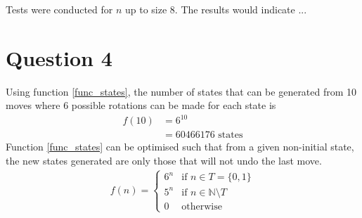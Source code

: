 \documentclass[]{article}
\begin{document}
Tests were conducted for \(n\) up to size 8. The results would indicate ...

\section*{Question 4}
Using function \ref{func_states}, the number of states that can be generated from 10 moves where 6 possible rotations can be made for each state is
\begin{equation*}
\begin{split}
  f(10) & = 6^{10} \\
		  & = 60466176\text{ states}
\end{split}
\end{equation*}								
Function \ref{func_states} can be optimised such that from a given non-initial state, the new states generated are only those that will not undo the last move.
\begin{equation}
\begin{split}
f(n) =
\begin{cases}
	6^{n} & \text{if }n \in T = \{0, 1\}\\
	5^{n} & \text{if }n \in \mathbb{N} \setminus T\\
	0 & \text{otherwise}
\end{cases}
\end{split}
\end{equation}	
\end{document}
